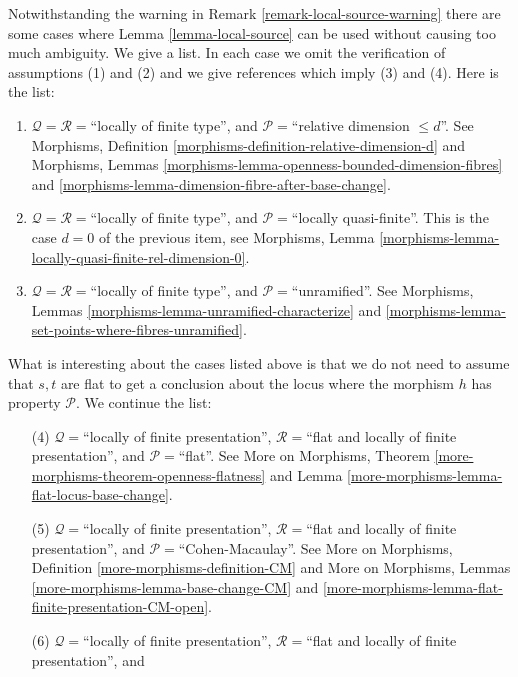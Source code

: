 \begin{remark}
\label{remark-local-source-apply}
Notwithstanding the warning in
Remark \ref{remark-local-source-warning}
there are some cases where
Lemma \ref{lemma-local-source}
can be used without causing too much ambiguity.
We give a list. In each case we omit the verification of
assumptions (1) and (2) and we give references which imply
(3) and (4). Here is the list:
\begin{enumerate}
\item $\mathcal{Q} = \mathcal{R} =$``locally of finite type'', and
$\mathcal{P} =$``relative dimension $\leq d$''.
See
Morphisms, Definition \ref{morphisms-definition-relative-dimension-d}
and
Morphisms, Lemmas \ref{morphisms-lemma-openness-bounded-dimension-fibres} and
\ref{morphisms-lemma-dimension-fibre-after-base-change}.
\item $\mathcal{Q} = \mathcal{R} =$``locally of finite type'', and
$\mathcal{P} =$``locally quasi-finite''.
This is the case $d = 0$ of the previous item, see
Morphisms, Lemma \ref{morphisms-lemma-locally-quasi-finite-rel-dimension-0}.
\item $\mathcal{Q} = \mathcal{R} =$``locally of finite type'', and
$\mathcal{P} =$``unramified''.
See
Morphisms, Lemmas \ref{morphisms-lemma-unramified-characterize} and
\ref{morphisms-lemma-set-points-where-fibres-unramified}.
\end{enumerate}
What is interesting about the cases listed above is that we do not
need to assume that $s, t$ are flat to get a conclusion about the locus
where the morphism $h$ has property $\mathcal{P}$. We continue the
list:
\begin{enumerate}
\item[(4)] $\mathcal{Q} =$``locally of finite presentation'',
$\mathcal{R} =$``flat and locally of finite presentation'', and
$\mathcal{P} =$``flat''. See
More on Morphisms, Theorem
\ref{more-morphisms-theorem-openness-flatness} and
Lemma \ref{more-morphisms-lemma-flat-locus-base-change}.
\item[(5)] $\mathcal{Q} =$``locally of finite presentation'',
$\mathcal{R} =$``flat and locally of finite presentation'', and
$\mathcal{P}=$``Cohen-Macaulay''. See
More on Morphisms, Definition \ref{more-morphisms-definition-CM}
and
More on Morphisms, Lemmas \ref{more-morphisms-lemma-base-change-CM} and
\ref{more-morphisms-lemma-flat-finite-presentation-CM-open}.
\item[(6)] $\mathcal{Q} =$``locally of finite presentation'',
$\mathcal{R} =$``flat and locally of finite presentation'', and

\end{enumerate}
\end{remark}
